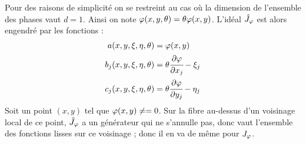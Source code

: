 \begin{preuve}
	Pour des raisons de simplicité on se restreint au cas où la dimension de l'ensemble des phases vaut $d=1$. Ainsi on note $\varphi(x,y,\theta)=\theta \varphi(x,y)$. L'idéal $\hat{J}_{\varphi}$ est alors engendré par les fonctions :
	\begin{align*}
	a(x,y,\xi,\eta,\theta)&=\varphi(x,y)\\
	b_j(x,y,\xi,\eta,\theta) &= \theta\cfrac{\partial \varphi}{\partial x_j}-\xi_j\\
	c_j(x,y,\xi,\eta,\theta) &= \theta\cfrac{\partial \varphi}{\partial y_j}-\eta_j
	\end{align*}
	Soit un point $(x,y)$ tel que $\varphi(x,y)\neq=0$. Sur la fibre au-dessus d'un voisinage local de ce point, $\hat{J}_{\varphi}$ a un générateur qui ne s'annulle pas, donc vaut l'ensemble des fonctions lisses sur ce voisinage ; donc il en va de même pour $J_{\varphi}$.
	

\end{preuve}
